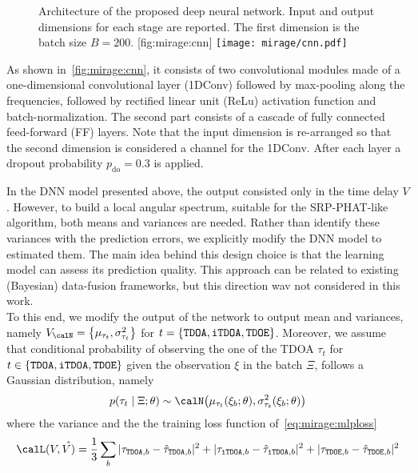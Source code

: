 \begin{figure}[h]
    \begin{sidecaption}[DNN]{
        Architecture of the proposed deep neural network. Input and output dimensions for each stage are reported. The first dimension is the batch size $B = 200$.
    }[fig:mirage:cnn]
    \centering
    \texttt{[image: mirage/cnn.pdf]}
    \end{sidecaption}
\end{figure}

\mynewline
As shown in~\cref{fig:mirage:cnn}, it consists of two convolutional modules made of a one-dimensional convolutional layer (1DConv) followed by max-pooling along the frequencies, followed by rectified linear unit (ReLu) activation function and batch-normalization.
The second part consists of a cascade of fully connected feed-forward (FF) layers.
Note that the input dimension is re-arranged so that the second dimension is considered a channel for the 1DConv.
After each layer a dropout probability $p_\text{do} = 0.3$ is applied.

\mynewline
In the \ac{DNN} model presented above, the output consisted only in the time delay $V$.
However, to build a local angular spectrum,
suitable for the \ac{SRP-PHAT}-like algorithm, both means and variances are needed.
Rather than identify these variances with the prediction errors, we explicitly modify the \ac{DNN} model to estimated them.
The main idea behind this design choice is that the learning model can assess its prediction quality.
This approach can be related to existing (Bayesian) data-fusion frameworks, but this direction wav not considered in this work.
\newcommand{\setTDOA}{\ensuremath{\set{\mathtt{TDOA}, \mathtt{iTDOA}, \mathtt{TDOE}}}}
\\To this end, we modify the output of the network to output mean and variances, namely
$V_{\calN} = \set{\mu_{\tau_t}, \sigma^2_{\tau_t}}$
for $t = \setTDOA$.
Moreover, we assume that conditional probability of observing the one of the \ac{TDOA} $\tau_t$ for $t \in \setTDOA$ given the observation $\xi$ in the batch $\Xi$, follows a Gaussian distribution, namely
\begin{equation}
    p(\tau_t \mid  \Xi ; \theta) \sim \calN\kparen{\mu_{\tau_t}(\xi_b;\theta), \sigma^2_{\tau_t}(\xi_b;\theta)}
\end{equation}
where the variance
and the the training loss function
 of~\cref{eq:mirage:mlploss}
\begin{equation}\label{subsec:mirage:mlpcost}
    \calL(V, \hat{V)} = \frac{1}{3} \sum_{b}  \powerOf{\tau_{\mathtt{TDOA}, b} - \hat{\tau}_{\mathtt{TDOA}, b}}
                                            + \powerOf{\tau_{\mathtt{iTDOA}, b} - \hat{\tau}_{\mathtt{iTDOA}, b}}
                                            + \powerOf{\tau_{\mathtt{TDOE}, b} - \hat{\tau}_{\mathtt{TDOE}, b}}
\end{equation}




